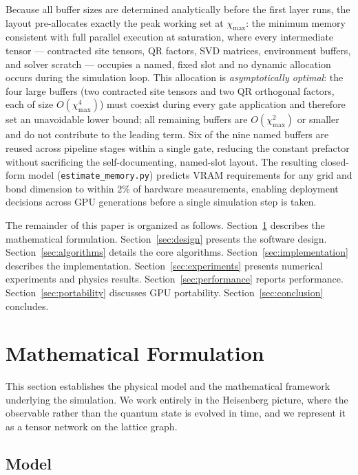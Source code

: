 \documentclass[11pt]{article}
\newcommand{\chimax}{\chi_{\mathrm{max}}}
\begin{document}
Because all buffer sizes are determined analytically before the first layer
runs, the layout pre-allocates exactly the peak working set at $\chimax$:
the minimum memory consistent with full parallel execution at saturation,
where every intermediate tensor --- contracted site tensors, QR factors,
SVD matrices, environment buffers, and solver scratch --- occupies a
named, fixed slot and no dynamic allocation occurs during the simulation loop.
This allocation is \emph{asymptotically optimal}: the four large buffers
(two contracted site tensors and two QR orthogonal factors,
each of size $O(\chimax^4)$) must coexist during every gate application
and therefore set an unavoidable lower bound; all remaining buffers are
$O(\chimax^2)$ or smaller and do not contribute to the leading term.
Six of the nine named buffers are reused across pipeline stages within a
single gate, reducing the constant prefactor without sacrificing the
self-documenting, named-slot layout.
The resulting closed-form model (\texttt{estimate\_memory.py}) predicts
VRAM requirements for any grid and bond dimension to within 2\% of hardware
measurements, enabling deployment decisions across GPU generations before
a single simulation step is taken.

The remainder of this paper is organized as follows. Section~\ref{sec:physics}
describes the mathematical formulation. Section~\ref{sec:design} presents the
software design. Section~\ref{sec:algorithms} details the core algorithms.
Section~\ref{sec:implementation} describes the implementation.
Section~\ref{sec:experiments} presents numerical experiments and physics results.
Section~\ref{sec:performance} reports performance. Section~\ref{sec:portability}
discusses GPU portability. Section~\ref{sec:conclusion} concludes.

\section{Mathematical Formulation}
\label{sec:physics}

This section establishes the physical model and the mathematical framework
underlying the simulation. We work entirely in the Heisenberg picture, where
the observable rather than the quantum state is evolved in time, and we
represent it as a tensor network on the lattice graph.

\subsection{Model}
\end{document}
